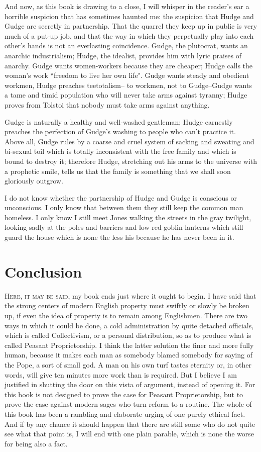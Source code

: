 \documentclass[final,10pt,letterpaper,twocolumn,openany]{book}
\newcommand{\dcap}[2]{
	 \lettrine[nindent=0em,findent=2pt,lines=3,loversize=.15,lraise=0]{#1}{#2}
 }
\begin{document}
    And now, as this book is drawing to a close, I will whisper in the
reader's ear a horrible suspicion that has sometimes haunted me: the
suspicion that Hudge and Gudge are secretly in partnership. That the
quarrel they keep up in public is very much of a put-up job, and that the
way in which they perpetually play into each other's hands is not an
everlasting coincidence. Gudge, the plutocrat, wants an anarchic
industrialism; Hudge, the idealist, provides him with lyric praises of
anarchy. Gudge wants women-workers because they are cheaper; Hudge
calls the woman's work ``freedom to live her own life". Gudge wants
steady and obedient workmen, Hudge preaches teetotalism-- to workmen,
not to Gudge--Gudge wants a tame and timid population who will never
take arms against tyranny; Hudge proves from Tolstoi that nobody must
take arms against anything. 

Gudge is naturally a healthy and well-washed
gentleman; Hudge earnestly preaches the perfection of Gudge's washing to
people who can't practice it. Above all, Gudge rules by a coarse and cruel
system of sacking and sweating and bi-sexual toil which is totally
inconsistent with the free family and which is bound to destroy it;
therefore Hudge, stretching out his arms to the universe with a prophetic
smile, tells us that the family is something that we shall soon gloriously
outgrow.

I do not know whether the partnership of Hudge and Gudge is
conscious or unconscious. I only know that between them they still keep
the common man homeless. I only know I still meet Jones walking the
streets in the gray twilight, looking sadly at the poles and barriers and low
red goblin lanterns which still guard the house which is none the less his
because he has never been in it.

\chapter{ Conclusion }

     \dcap{H}{ere, it may be said,}my book ends just where it ought to begin. I have
said that the strong centers of modern English property must swiftly or
slowly be broken up, if even the idea of property is to remain among
Englishmen. There are two ways in which it could be done, a cold
administration by quite detached officials, which is called Collectivism, or
a personal distribution, so as to produce what is called Peasant
Proprietorship. I think the latter solution the finer and more fully human,
because it makes each man as somebody blamed somebody for saying of
the Pope, a sort of small god. A man on his own turf tastes eternity or, in
other words, will give ten minutes more work than is required. But I
believe I am justified in shutting the door on this vista of argument,
instead of opening it. For this book is not designed to prove the case for
Peasant Proprietorship, but to prove the case against modern sages who
turn reform to a routine. The whole of this book has been a rambling and
elaborate urging of one purely ethical fact. And if by any chance it should
happen that there are still some who do not quite see what that point is, I
will end with one plain parable, which is none the worse for being also a
fact.
\end{document}
